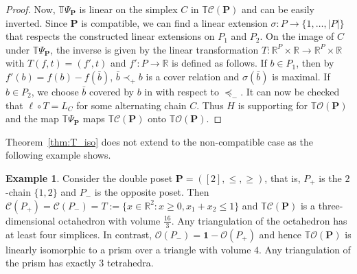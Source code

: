 \documentclass[11pt]{amsart}
\theoremstyle{definition}
\newtheorem{example}{Example}
\begin{document}
\begin{proof}
    Now, ${{\mathbb{T}}{\Psi}_{\mathbf{P}}}$ is linear on the simplex $C$ in ${{\mathbb{T}}{\mathcal{C}({{{\mathbf{P}}}})}}$ and can
    be easily inverted. Since ${\mathbf{P}}$ is compatible, we can find a linear
    extension $\sigma : {P} \rightarrow \{1,\dots,|{P}|\}$ that respects the
    constructed linear extensions on ${P}_1$ and ${P}_2$. On the image of $C$
    under ${{\mathbb{T}}{\Psi}_{\mathbf{P}}}$, the inverse is given by the linear transformation $T :
    {\mathbb{R}}^{P} \times {\mathbb{R}} \to {\mathbb{R}}^{P} \times {\mathbb{R}}$ with $T(f,t) = (f',t)$ and $f' : {P}
    \rightarrow {\mathbb{R}}$ is defined as follows. If $b \in {P}_1$, then by $f'(b) =
    f(b) - f(\bar b)$, $\bar b \prec_+ b$ is a cover relation and $\sigma(\bar
    b)$ is maximal. If $b \in {P}_2$, we choose $\bar b$ covered by $b$ in with
    respect to $\preceq_-$. It can now be checked that $\ell \circ T = L_C$
    for some alternating chain $C$. Thus $H$ is supporting for ${{\mathbb{T}}{\mathcal{O}({\mathbf{P}})}}$
    and the map ${{\mathbb{T}}{\Psi}_{\mathbf{P}}}$ maps ${{\mathbb{T}}{\mathcal{C}({{{\mathbf{P}}}})}}$ onto ${{\mathbb{T}}{\mathcal{O}({\mathbf{P}})}}$.
\end{proof}

Theorem~\ref{thm:T_iso} does not extend to the non-compatible case as the
following example shows.

\begin{example}
    Consider the double poset ${\mathbf{P}} = ([2],\le,\ge)$, that is, ${P}_+$ is the
    $2$-chain $\{1,2\}$ and ${P}_-$ is the opposite poset.  Then ${\mathcal{C}({{{P}_+}})}
    = {\mathcal{C}({{{P}_-}})} = T := \{ x \in {\mathbb{R}}^2 : x \ge 0, x_1 + x_2 \le 1\}$ and
    ${{\mathbb{T}}{\mathcal{C}({{{\mathbf{P}}}})}}$ is a three-dimensional octahedron with volume
    $\frac{16}{3}$.  Any triangulation of the octahedron has at least four
    simplices.
    In contrast, ${\mathcal{O}({{P}_-})} = {\mathbf{1}} - {\mathcal{O}({{P}_+})}$ and hence ${{\mathbb{T}}{\mathcal{O}({\mathbf{P}})}}$ is
    linearly isomorphic to a prism over a triangle with volume $4$. Any
    triangulation of the prism has exactly $3$ tetrahedra. 
\end{example}
\end{document}
